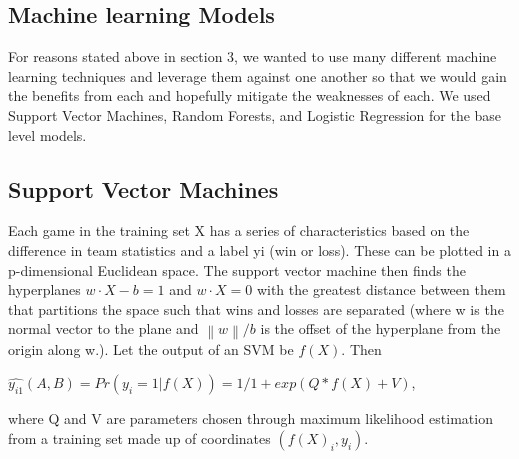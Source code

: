 \documentclass{article}
\begin{document}
\begin{multicols}{2}
	\section{Machine learning Models}
	For reasons stated above in section 3, we wanted to use many different machine learning techniques and leverage them against one another so that we would gain the benefits from each and hopefully mitigate the weaknesses of each. We used Support Vector Machines, Random Forests, and Logistic Regression for the base level models.
	
	\subsection{Support Vector Machines}
	Each game in the training set X has a series of characteristics based on the difference in team statistics and a label yi (win or loss). These can be plotted in a p-dimensional Euclidean space. The support vector machine then finds the hyperplanes $w·X-b = 1$ and $w ·X = 0$ with the greatest distance between them that partitions the space such that wins and losses are separated (where w is the normal vector to the plane and $\left \| w \right \|/b$ is the offset of the hyperplane from the origin along w.)\cite{4}. Let the output of an SVM be $f(X)$. Then
	\begin{center}
	$\hat{y_{i1}}(A,B)  = Pr(y_i = 1| f(X)) = 1/ 1+exp(Q * f(X) +V)$,
	\end{center}
where Q and V are parameters chosen through maximum likelihood estimation from a training set made up of coordinates $(f(X)_i, y_i)$.\cite{4}


\end{multicols}
\end{document}
